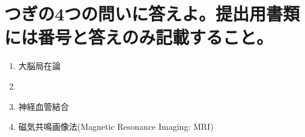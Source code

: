 \documentclass[titlepage,a4paper]{jsarticle}
\begin{document}
\section{つぎの4つの問いに答えよ。提出用書類には番号と答えのみ記載すること。}
\begin{enumerate}
      \item 大脳局在論
      \item %
      \item 神経血管結合
      \item 磁気共鳴画像法(Magnetic Resonance Imaging: MRI)
\end{enumerate}
\end{document}
